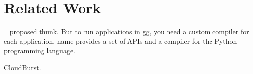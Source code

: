 \section{Related Work}\label{sec:related}

\gg~\cite{gg-atc} proposed thunk. But to run applications in gg, you need a custom
compiler for each application. name{} provides a set of APIs and a compiler
for the Python programming language.


CloudBurst.
